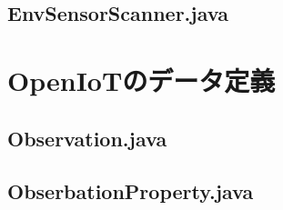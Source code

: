\documentclass{kuisthesis}			%
\begin{document}
\subsection{EnvSensorScanner.java}


\section{OpenIoTのデータ定義}
\subsection{Observation.java}


\subsection{ObserbationProperty.java}

\end{document}
